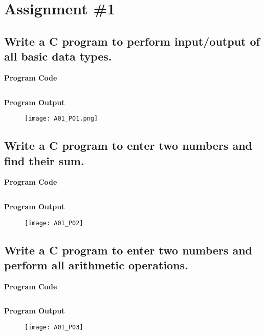 \section{Assignment \#1}

\subsection{Write a C program to perform input/output of all basic data types.}
\textbf{Program Code}

\inputminted{C}{programs/A01_P01.c}

\textbf{Program Output}

\begin{figure}[h]
  \texttt{[image: A01\_P01.png]}
\end{figure}

\newpage



\subsection{Write a C program to enter two numbers and find their sum.}
\textbf{Program Code}

\inputminted{C}{programs/A01_P02.c}

\textbf{Program Output}

\begin{figure}[h]
  \texttt{[image: A01\_P02]}
\end{figure}

\newpage



\subsection{Write a C program to enter two numbers and perform all arithmetic operations.}
\textbf{Program Code}

\inputminted{C}{programs/A01_P03.c}

\textbf{Program Output}

\begin{figure}[h]
  \texttt{[image: A01\_P03]}
\end{figure}

\newpage




